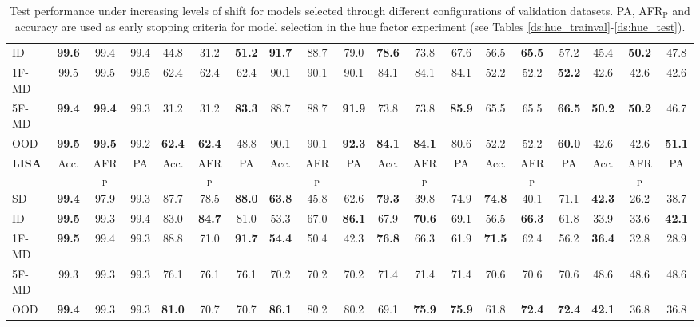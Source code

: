 \begin{table}[H]
{\begin{tabular}{l|ccc|ccc|ccc|ccc|ccc|ccc}
    ID & {\textbf{99.6}} & 99.4 & 99.4 & 44.8 & 31.2 & {\textbf{51.2}} & {\textbf{91.7}} & 88.7 & 79.0 & {\textbf{78.6}} & 73.8 & 67.6 & 56.5 & {\textbf{65.5}} & 57.2 & 45.4 & {\textbf{50.2}} & 47.8 \\
    1F-MD & 99.5 & 99.5 & 99.5 & 62.4 & 62.4 & 62.4 & 90.1 & 90.1 & 90.1 & 84.1 & 84.1 & 84.1 & 52.2 & 52.2 & {\textbf{52.2}} & 42.6 & 42.6 & 42.6 \\
    5F-MD & {\textbf{99.4}} & \textbf{99.4} & 99.3 & 31.2 & 31.2 & {\textbf{83.3}} & 88.7 & 88.7 & {\textbf{91.9}} & 73.8 & 73.8 & {\textbf{85.9}} & 65.5 & 65.5 & {\textbf{66.5}} & {\textbf{50.2}} & \textbf{50.2} & 46.7 \\
    OOD & {\textbf{99.5}} & \textbf{99.5} & 99.2 & {\textbf{62.4}} & \textbf{62.4} & 48.8 & 90.1 & 90.1 & {\textbf{92.3}} & {\textbf{84.1}} & \textbf{84.1} & 80.6 & 52.2 & 52.2 & {\textbf{60.0}} & 42.6 & 42.6 & {\textbf{51.1}} \\
    \midrule
    \addlinespace
    \addlinespace
    \textbf{{\color{tab:green} \textbf{LISA}}} & Acc. & AFR$_\text{P}$ & PA & Acc. & AFR$_\text{P}$ & PA & Acc. & AFR$_\text{P}$ & PA & Acc. & AFR$_\text{P}$ & PA & Acc. & AFR$_\text{P}$ & PA & Acc. & AFR$_\text{P}$ & PA \\
    \midrule
    SD & {\textbf{99.4}} & 97.9 & 99.3 & 87.7 & 78.5 & {\textbf{88.0}} & {\textbf{63.8}} & 45.8 & 62.6 & {\textbf{79.3}} & 39.8 & 74.9 & {\textbf{74.8}} & 40.1 & 71.1 & {\textbf{42.3}} & 26.2 & 38.7 \\
    ID & {\textbf{99.5}} & 99.3 & 99.4 & 83.0 & {\textbf{84.7}} & 81.0 & 53.3 & 67.0 & {\textbf{86.1}} & 67.9 & {\textbf{70.6}} & 69.1 & 56.5 & {\textbf{66.3}} & 61.8 & 33.9 & 33.6 & {\textbf{42.1}} \\
    1F-MD & {\textbf{99.5}} & 99.4 & 99.3 & 88.8 & 71.0 & {\textbf{91.7}} & {\textbf{54.4}} & 50.4 & 42.3 & {\textbf{76.8}} & 66.3 & 61.9 & {\textbf{71.5}} & 62.4 & 56.2 & {\textbf{36.4}} & 32.8 & 28.9 \\
    5F-MD & 99.3 & 99.3 & 99.3 & 76.1 & 76.1 & 76.1 & 70.2 & 70.2 & 70.2 & 71.4 & 71.4 & 71.4 & 70.6 & 70.6 & 70.6 & 48.6 & 48.6 & 48.6 \\
    OOD & {\textbf{99.4}} & 99.3 & 99.3 & {\textbf{81.0}} & 70.7 & 70.7 & {\textbf{86.1}} & 80.2 & 80.2 & 69.1 & \textbf{75.9} & {\textbf{75.9}} & 61.8 & \textbf{72.4} & {\textbf{72.4}} & {\textbf{42.1}} & 36.8 & 36.8 \\
    \bottomrule
    \end{tabular}%
    }
    \caption{Test performance under increasing levels of shift for models selected through different configurations of 
    validation datasets. PA, AFR$_{\text{P}}$ and accuracy are used as early stopping criteria for model selection
    in the hue factor experiment (see Tables \ref{ds:hue_trainval}-\ref{ds:hue_test}).
    }
    \label{tab:dg_hue_paired}
    \end{table}
        
